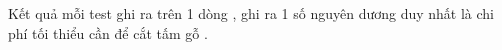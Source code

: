 Kết quả mỗi test ghi ra trên 1 dòng , ghi ra 1 số nguyên dương duy nhất là chi phí tối thiểu cần để cắt tấm gỗ .